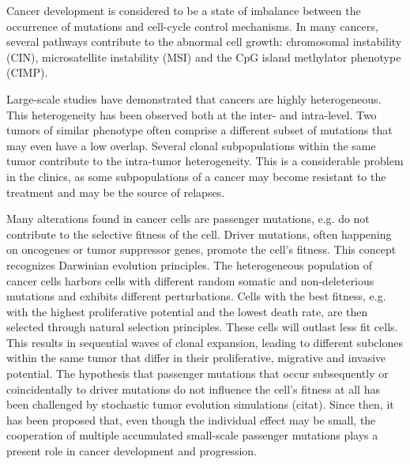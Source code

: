     Cancer development is considered to be a state of imbalance between the
    occurrence of mutations and cell-cycle control mechanisms. In many cancers,
    several pathways contribute to the abnormal cell growth: chromosomal
    instability (CIN), microsatellite instability (MSI) and the CpG island
    methylator phenotype (CIMP).

    Large-scale studies have demonstrated that cancers are highly heterogeneous.
    This heterogeneity has been observed both at the inter- and intra-level. Two
    tumors of similar phenotype often comprise a different subset of mutations
    that may even have a low overlap. Several clonal subpopulations within the
    same tumor contribute to the intra-tumor heterogeneity. This is a
    considerable problem in the clinics, as some subpopulations of a cancer may
    become resistant to the  treatment and may be the source of relapses.

    Many alterations found in cancer cells are passenger mutations, e.g. do not
    contribute to the selective fitness of the cell. Driver mutations, often
    happening on oncogenes or tumor suppressor genes, promote the cell's
    fitness. This concept recognizes Darwinian evolution principles. The
    heterogeneous  population of cancer cells harbors cells with different
    random somatic and non-deleterious mutations and exhibits different
    perturbations. Cells with the best fitness, e.g. with the highest
    proliferative potential  and the lowest death rate, are then selected
    through natural selection principles. These cells will outlast less fit
    cells. This results in  sequential waves of clonal expansion, leading to
    different subclones within the same tumor that differ in their
    proliferative, migrative and invasive potential. The hypothesis that
    passenger mutations that occur subsequently or coincidentally to driver
    mutations do not influence the cell's fitness at all has been
    challenged by stochastic tumor evolution simulations (citat). Since then,
    it has been proposed that, even though the individual effect may be
    small, the cooperation of multiple accumulated small-scale passenger
    mutations plays a present role in cancer development and progression.


